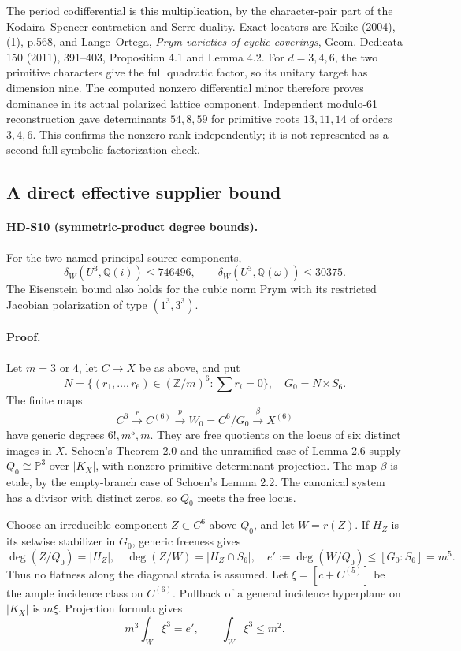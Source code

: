The period codifferential is this multiplication, by the character-pair
part of the Kodaira--Spencer contraction and Serre duality.
Exact locators are Koike (2004), (1), p.568, and Lange--Ortega,
\emph{Prym varieties of cyclic coverings}, Geom. Dedicata 150 (2011),
391--403, Proposition 4.1 and Lemma 4.2.
For \(d=3,4,6\), the two primitive characters give the full quadratic
factor, so its unitary target has dimension nine. The computed
nonzero differential minor therefore proves dominance in its actual
polarized lattice component.
Independent modulo-61 reconstruction gave determinants
\(54,8,59\) for primitive roots \(13,11,14\) of orders \(3,4,6\).
This confirms the nonzero rank independently; it is not represented as
a second full symbolic factorization check.

\subsection{A direct effective supplier bound}

\paragraph{HD-S10 (symmetric-product degree bounds).}
For the two named principal source components,
\[
\delta_W(U^3,\mathbb Q(i))\le746496,\qquad
\delta_W(U^3,\mathbb Q(\omega))\le30375.
\]
The Eisenstein bound also holds for the cubic norm Prym with its
restricted Jacobian polarization of type \((1^3,3^3)\).

\paragraph{Proof.}
Let \(m=3\) or \(4\), let \(C\to X\) be as above, and put
\[
N=\{(r_1,\ldots,r_6)\in(\mathbb Z/m)^6:\sum r_i=0\},\quad
G_0=N\rtimes S_6.
\]
The finite maps
\[
C^6\xrightarrow r C^{(6)}
\xrightarrow p W_0=C^6/G_0
\xrightarrow\beta X^{(6)}
\]
have generic degrees \(6!,m^5,m\).
They are free quotients on the locus of six distinct images in \(X\).
Schoen's Theorem 2.0 and the unramified case of Lemma 2.6 supply
\(Q_0\cong\mathbb P^3\) over \(|K_X|\), with nonzero primitive
determinant projection. The map \(\beta\) is etale, by the empty-branch
case of Schoen's Lemma 2.2.
The canonical system has a divisor with distinct zeros, so \(Q_0\)
meets the free locus.

Choose an irreducible component \(Z\subset C^6\) above \(Q_0\), and let
\(W=r(Z)\). If \(H_Z\) is its setwise stabilizer in \(G_0\), generic
freeness gives
\[
\deg(Z/Q_0)=|H_Z|,\quad
\deg(Z/W)=|H_Z\cap S_6|,\quad
e':=\deg(W/Q_0)\le[G_0:S_6]=m^5.
\]
Thus no flatness along the diagonal strata is assumed.
Let \(\xi=[c+C^{(5)}]\) be the ample incidence class on \(C^{(6)}\).
Pullback of a general incidence hyperplane on \(|K_X|\) is \(m\xi\).
Projection formula gives
\[
m^3\int_W\xi^3=e',\qquad \int_W\xi^3\le m^2.                 \tag{S10.1}
\]

